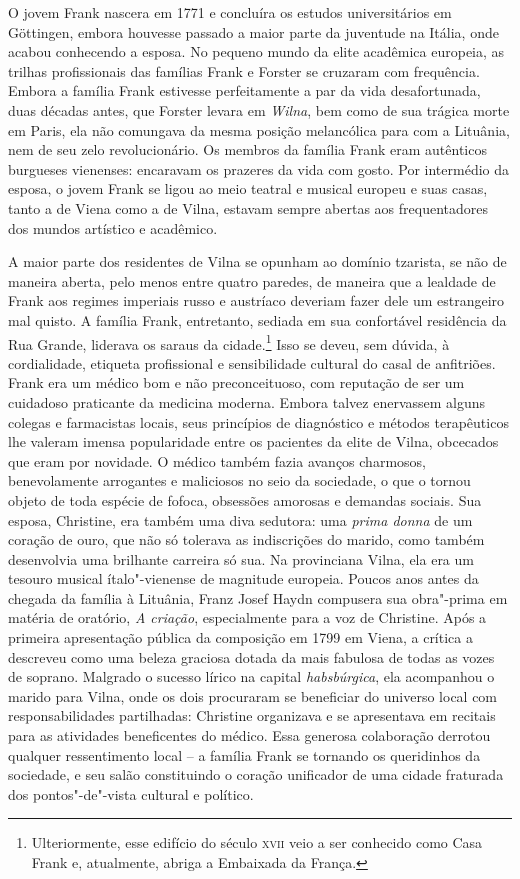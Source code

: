 O jovem Frank nascera em 1771 e concluíra os estudos universitários em
Göttingen, embora houvesse passado a maior parte da juventude na Itália,
onde acabou conhecendo a esposa. No pequeno mundo da elite acadêmica
europeia, as trilhas profissionais das famílias Frank e Forster se
cruzaram com frequência. Embora a família Frank estivesse perfeitamente
a par da vida desafortunada, duas décadas antes, que Forster levara em
\textit{Wilna}, bem como de sua trágica morte em Paris, ela não comungava da
mesma posição melancólica para com a Lituânia, nem de seu zelo
revolucionário. Os membros da família Frank eram autênticos burgueses
vienenses: encaravam os prazeres da vida com gosto. Por intermédio da
esposa, o jovem Frank se ligou ao meio teatral e musical europeu e suas
casas, tanto a de Viena como a de Vilna, estavam sempre abertas aos
frequentadores dos mundos artístico e acadêmico.

A maior parte dos residentes de Vilna se opunham ao domínio tzarista, se
não de maneira aberta, pelo menos entre quatro paredes, de maneira que a
lealdade de Frank aos regimes imperiais russo e austríaco deveriam fazer
dele um estrangeiro mal quisto. A família Frank, entretanto, sediada em
sua confortável residência da Rua Grande, liderava os saraus da
cidade.\footnote{Ulteriormente, esse edifício do século \textsc{xvii} veio a ser conhecido como Casa Frank e, atualmente, abriga a Embaixada da França.} Isso se deveu, sem dúvida, à cordialidade, etiqueta profissional e
sensibilidade cultural do casal de anfitriões. Frank era um médico bom e
não preconceituoso, com reputação de ser um cuidadoso praticante da
medicina moderna. Embora talvez enervassem alguns colegas e farmacistas
locais, seus princípios de diagnóstico e métodos terapêuticos lhe
valeram imensa popularidade entre os pacientes da elite de Vilna,
obcecados que eram por novidade. O médico também fazia avanços
charmosos, benevolamente arrogantes e maliciosos no seio da sociedade, o
que o tornou objeto de toda espécie de fofoca, obsessões amorosas e
demandas sociais. Sua esposa, Christine, era também uma diva sedutora:
uma \textit{prima donna} de um coração de ouro, que não só tolerava as
indiscrições do marido, como também desenvolvia uma brilhante carreira
só sua. Na provinciana Vilna, ela era um tesouro musical ítalo"-vienense
de magnitude europeia. Poucos anos antes da chegada da família à
Lituânia, Franz Josef Haydn compusera sua obra"-prima em matéria de
oratório, \textit{A criação}, especialmente para a voz de Christine. Após
a primeira apresentação pública da composição em 1799 em Viena, a
crítica a descreveu como uma beleza graciosa dotada da mais fabulosa de
todas as vozes de soprano. Malgrado o sucesso lírico na capital
\textit{habsbúrgica}, ela acompanhou o marido para Vilna, onde os dois procuraram
se beneficiar do universo local com responsabilidades partilhadas:
Christine organizava e se apresentava em recitais para as atividades
beneficentes do médico. Essa generosa colaboração derrotou qualquer
ressentimento local -- a família Frank se tornando os queridinhos da
sociedade, e seu salão constituindo o coração unificador de uma cidade
fraturada dos pontos"-de"-vista cultural e político.

